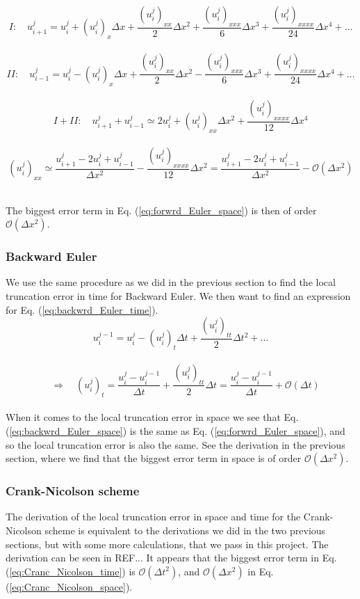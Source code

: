 \documentclass[12pt]{article}
\begin{document}
\begin{flushleft}
\vspace{5mm}
$$I:\quad u_{i+1}^j = u_i^j + (u_i^j)_x\Delta x + \frac{(u_i^j)_{xx}}{2}\Delta x^2 + \frac{(u_i^j)_{xxx}}{6}\Delta x^3 + \frac{(u_i^j)_{xxxx}}{24}\Delta x^4 + \dots$$\\
$$II:\quad u_{i-1}^j = u_i^j - (u_i^j)_x\Delta x + \frac{(u_i^j)_{xx}}{2}\Delta x^2 - \frac{(u_i^j)_{xxx}}{6}\Delta x^3 + \frac{(u_i^j)_{xxxx}}{24}\Delta x^4 + \dots$$\\
$$I+II:\quad u_{i+1}^j + u_{i-1}^j  \simeq 2u_i^j + (u_i^j)_{xx}\Delta x^2 + \frac{(u_i^j)_{xxxx}}{12}\Delta x^4$$\\
$$(u_i^j)_{xx}\simeq \frac{u_{i+1}^j - 2u_i^j + u_{i-1}^j}{\Delta x^2} - \frac{(u_i^j)_{xxxx}}{12}\Delta x^2 = \frac{u_{i+1}^j - 2u_i^j + u_{i-1}^j}{\Delta x^2} - \mathcal{O}(\Delta x^2)$$\\
\vspace{5mm}

The biggest error term in Eq. (\ref{eq:forwrd_Euler_space}) is then of order $\mathcal{O}(\Delta x^2)$.

\subsubsection{Backward Euler}
We use the same procedure as we did in the previous section to find the local truncation error in time for Backward Euler. We then want to find an expression for Eq. (\ref{eq:backwrd_Euler_time}).
\vspace{5mm}
$$u_i^{j-1} = u_i^j - (u_i^j)_t\Delta t + \frac{(u_i^j)_{tt}}{2}\Delta t^2 + \dots$$\\
$$\quad\Rightarrow\quad (u_i^j)_t = \frac{u_i^j - u_i^{j-1}}{\Delta t} + \frac{(u_i^j)_{tt}}{2}\Delta t = \frac{u_i^j - u_i^{j-1}}{\Delta t} + \mathcal{O}(\Delta t)$$\\
\vspace{5mm} 
When it comes to the local truncation error in space we see that Eq. (\ref{eq:backwrd_Euler_space}) is the same as Eq. (\ref{eq:forwrd_Euler_space}), and so the local truncation error is also the same. See the derivation in the previous section, where we find that the biggest error term in space is of order $\mathcal{O}(\Delta x^2)$.

\subsubsection{Crank-Nicolson scheme}
The derivation of the local truncation error in space and time for the Crank-Nicolson scheme is equivalent to the derivations we did in the two previous sections, but with some more calculations, that we pass in this project. The derivation can be seen in REF... It appears that the biggest error term in Eq. (\ref{eq:Cranc_Nicolson_time}) is $\mathcal{O}(\Delta t^2)$, and $\mathcal{O}(\Delta x^2)$ in Eq. (\ref{eq:Cranc_Nicolson_space}).
\newpage

\end{flushleft}
\end{document}
